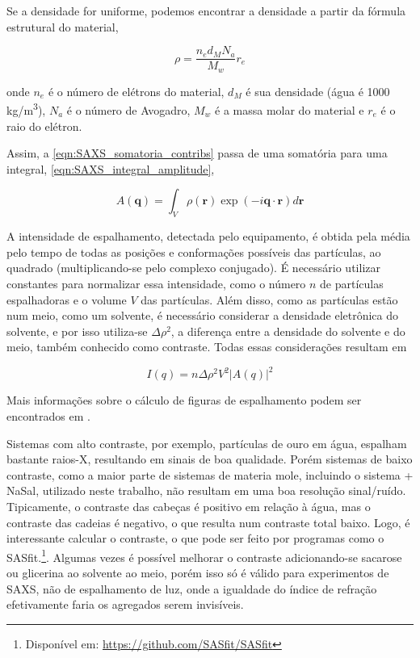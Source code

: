 		Se a densidade for uniforme, podemos encontrar a densidade a partir da fórmula estrutural do material, \cite{Narayanan2008a}
		
		\begin{equation}
			\rho = \dfrac{n_e d_M N_a}{M_w} r_e
			\label{eqn:rho_uniforme}
		\end{equation}
		
		\noindent onde \(n_e\) é o número de elétrons do material, \(d_M\) é sua densidade (água é 1000 kg/m\textsuperscript{3}), \(N_a\) é o número de Avogadro, \(M_w\) é a massa molar do material e \(r_e\) é o raio do elétron.
		
		Assim, a \autoref{eqn:SAXS_somatoria_contribs} passa de uma somatória para uma integral, \autoref{eqn:SAXS_integral_amplitude}, \cite{Narayanan2008a}
		
		\begin{equation}
			A(\mathbf{q}) = \int_V \rho(\mathbf{r}) \exp(-i \mathbf{q} \cdot \mathbf{r}) d\mathbf{r}
			\label{eqn:SAXS_integral_amplitude}
		\end{equation}
		
		A intensidade de espalhamento, detectada pelo equipamento, é obtida pela média pelo tempo de todas as posições e conformações possíveis das partículas, ao quadrado (multiplicando-se pelo complexo conjugado).\cite{Pecora2008a} É necessário utilizar constantes para normalizar essa intensidade, como o número \(n\) de partículas espalhadoras e o volume \(V\) das partículas. Além disso, como as partículas estão num meio, como um solvente, é necessário considerar a densidade eletrônica do solvente, e por isso utiliza-se \(\Delta \rho^2\), a diferença entre a densidade do solvente e do meio, também conhecido como contraste. Todas essas considerações resultam em\cite{Pedersen_Aula1}
		
		\begin{equation}
		I(q) = n\Delta \rho^2 V^2 |A(q)|^2
		\label{eqn:SAXS_I_funcao_A}
		\end{equation}

		Mais informações sobre o cálculo de figuras de espalhamento podem ser encontrados em \citeauthor{Alves2017}.
		
		Sistemas com alto contraste, por exemplo, partículas de ouro em água, espalham bastante raios-X, resultando em sinais de boa qualidade. Porém sistemas de baixo contraste, como a maior parte de sistemas de materia mole, incluindo o sistema \TTAB{} + NaSal, utilizado neste trabalho, não resultam em uma boa resolução sinal/ruído. Tipicamente, o contraste das cabeças é positivo em relação à água, mas o contraste das cadeias é negativo, o que resulta num contraste total baixo. Logo, é interessante calcular o contraste, o que pode ser feito por programas como o SASfit.\footnote{Disponível em: \url{https://github.com/SASfit/SASfit}}. Algumas vezes é possível melhorar o contraste adicionando-se sacarose ou glicerina ao solvente ao meio, porém isso só é válido para experimentos de SAXS, não de espalhamento de luz, onde a igualdade do índice de refração efetivamente faria os agregados serem invisíveis.
		
